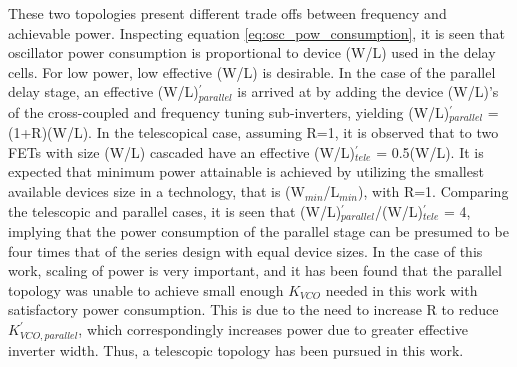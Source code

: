 			These two topologies present different trade offs between frequency and achievable power. Inspecting equation \ref{eq:osc_pow_consumption}, it is seen that oscillator power consumption is proportional to device (W/L) used in the delay cells. For low power, low effective (W/L) is desirable. In the case of the parallel delay stage, an effective (W/L)$_{parallel}^{'}$ is arrived at by adding the device (W/L)'s of the cross-coupled and frequency tuning sub-inverters, yielding (W/L)$_{parallel}^{'}$ = (1+R)(W/L). In the telescopical case, assuming R=1, it is observed that to two FETs with size (W/L) cascaded have an effective (W/L)$_{tele}^{'}$ = 0.5(W/L). It is expected that minimum power attainable is achieved by utilizing the smallest available devices size in a technology, that is (W$_{min}$/L$_{min}$), with R=1. Comparing the telescopic and parallel cases, it is seen that (W/L)$_{parallel}^{'}$/(W/L)$_{tele}^{'}$ = 4, implying that the power consumption of the parallel stage can be presumed to be four times that of the series design with equal device sizes. In the case of this work, scaling of power is very important, and it has been found that the parallel topology was unable to achieve small enough $K_{VCO}$ needed in this work with satisfactory power consumption. This is due to the need to increase R to reduce $K_{VCO,parallel}^{'}$, which correspondingly increases power due to greater effective inverter width. Thus, a telescopic topology has been pursued in this work.

